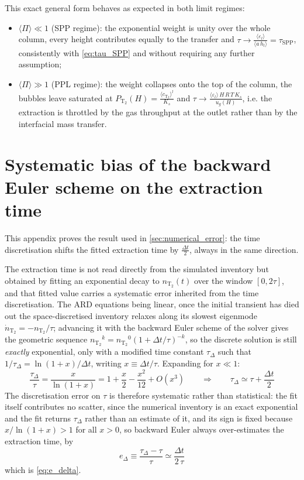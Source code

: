 \documentclass[a4paper,11pt,oneside]{report}
\newcommand{\PT}{\ensuremath{P_\mathrm{T_2}}}
\newcommand{\CT}{\ensuremath{c_\mathrm{T_2}}}
\newcommand{\NT}{\ensuremath{n_\mathrm{T_2}}}
\newcommand{\dotNT}{\ensuremath{\dot n_\mathrm{T_2}}}
\newcounter{assumption}[chapter]
\begin{document}
This exact general form behaves as expected in both limit regimes:
\begin{itemize}
    \item $\langle\Pi\rangle\ll1$ (SPP regime): the exponential weight is unity over the whole column, every height contributes equally to the transfer and $\tau\rightarrow\frac{\langle \varepsilon_l \rangle}{\langle a\,h_l \rangle}=\tau_\mathrm{SPP}$, consistently with \cref{eq:tau_SPP} and without requiring any further assumption;
    \item $\langle\Pi\rangle\gg1$ (PPL regime): the weight collapses onto the top of the column, the bubbles leave saturated at $\PT(H)=\frac{\langle\CT\rangle^l}{K_s}$ and $\tau\rightarrow\frac{\langle \varepsilon_l \rangle\,H\,R\,T\,K_s}{u_g(H)}$, i.e. the extraction is throttled by the gas throughput at the outlet rather than by the interfacial mass transfer.
\end{itemize}

\chapter{Systematic bias of the backward Euler scheme on the extraction time}
\label{app:dt_bias}

This appendix proves the result used in \cref{sec:numerical_error}: the time discretisation shifts the fitted extraction time by $\frac{\Delta t}{2}$, always in the same direction.

The extraction time is not read directly from the simulated inventory but obtained by fitting an exponential decay to $\NT(t)$ over the window $[0,2\tau]$, and that fitted value carries a systematic error inherited from the time discretisation. The ARD equations being linear, once the initial transient has died out the space-discretised inventory relaxes along its slowest eigenmode $\dotNT=-\NT/\tau$; advancing it with the backward Euler scheme of the solver gives the geometric sequence $\NT^{k}=\NT^{0}(1+\Delta t/\tau)^{-k}$, so the discrete solution is still \emph{exactly} exponential, only with a modified time constant $\tau_\Delta$ such that $1/\tau_\Delta=\ln(1+x)/\Delta t$, writing $x\equiv\Delta t/\tau$. Expanding for $x\ll1$:
\begin{equation}
\label{eq:tau_delta_expansion}
    \frac{\tau_\Delta}{\tau}=\frac{x}{\ln(1+x)}=1+\frac{x}{2}-\frac{x^{2}}{12}+O(x^{3})
    \qquad \Longrightarrow \qquad
    \tau_\Delta \simeq \tau+\frac{\Delta t}{2}
\end{equation}
The discretisation error on $\tau$ is therefore systematic rather than statistical: the fit itself contributes no scatter, since the numerical inventory is an exact exponential and the fit returns $\tau_\Delta$ rather than an estimate of it, and its sign is fixed because $x/\ln(1+x)>1$ for all $x>0$, so backward Euler always over-estimates the extraction time, by
\begin{equation*}
    e_\Delta \equiv \frac{\tau_\Delta-\tau}{\tau}\simeq\frac{\Delta t}{2\,\tau}
\end{equation*}
which is \cref{eq:e_delta}.
\end{document}
